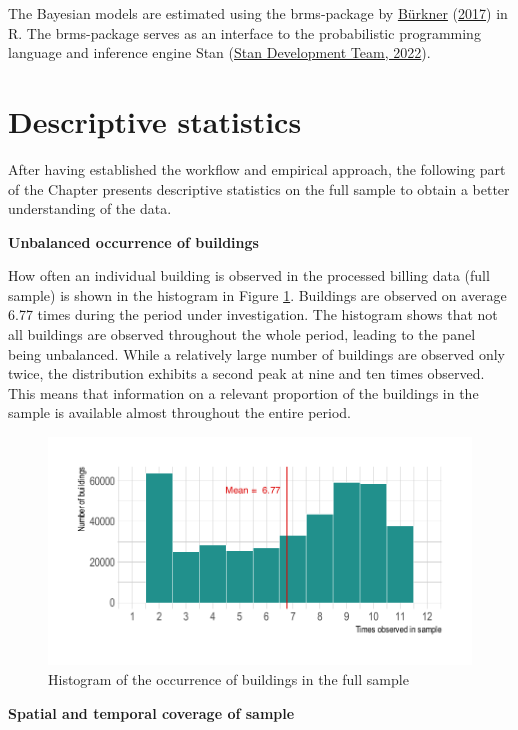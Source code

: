 \documentclass[12pt,twoside]{reedthesis}
\begin{document}
The Bayesian models are estimated using the brms-package by \protect\hyperlink{ref-burkner17}{Bürkner} (\protect\hyperlink{ref-burkner17}{2017}) in R. The brms-package serves as an interface to the probabilistic programming language and inference engine Stan (\protect\hyperlink{ref-standevelopmentteam22}{Stan Development Team, 2022}).

\hypertarget{descriptives}{%
\section{Descriptive statistics}\label{descriptives}}

After having established the workflow and empirical approach, the following part of the Chapter presents descriptive statistics on the full sample to obtain a better understanding of the data.

\textbf{Unbalanced occurrence of buildings}

How often an individual building is observed in the processed billing data (full sample) is shown in the histogram in Figure \ref{fig:occurrence-buildings}. Buildings are observed on average 6.77 times during the period under investigation. The histogram shows that not all buildings are observed throughout the whole period, leading to the panel being unbalanced. While a relatively large number of buildings are observed only twice, the distribution exhibits a second peak at nine and ten times observed. This means that information on a relevant proportion of the buildings in the sample is available almost throughout the entire period.
\begin{figure}

{\centering \includegraphics[width=0.75\linewidth]{figure/occurance_buildings} 

}

\caption{Histogram of the occurrence of buildings in the full sample}\label{fig:occurrence-buildings}
\end{figure}
\textbf{Spatial and temporal coverage of sample}
\end{document}
